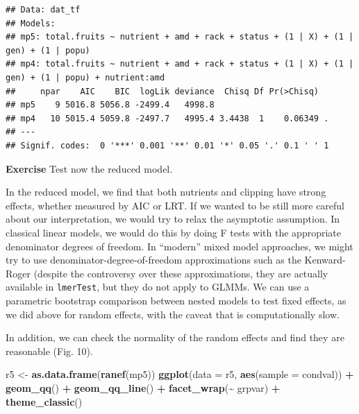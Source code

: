 \documentclass[
  12pt,
]{book}
\newenvironment{Shaded}{\begin{snugshade}}{\end{snugshade}}
\newcommand{\DataTypeTok}[1]{\textcolor[rgb]{0.13,0.29,0.53}{#1}}
\newcommand{\KeywordTok}[1]{\textcolor[rgb]{0.13,0.29,0.53}{\textbf{#1}}}
\newcommand{\NormalTok}[1]{#1}
\newcommand{\OperatorTok}[1]{\textcolor[rgb]{0.81,0.36,0.00}{\textbf{#1}}}
\newcommand{\StringTok}[1]{\textcolor[rgb]{0.31,0.60,0.02}{#1}}
\begin{document}
\begin{verbatim}
## Data: dat_tf
## Models:
## mp5: total.fruits ~ nutrient + amd + rack + status + (1 | X) + (1 | gen) + (1 | popu)
## mp4: total.fruits ~ nutrient + amd + rack + status + (1 | X) + (1 | gen) + (1 | popu) + nutrient:amd
##     npar    AIC    BIC  logLik deviance  Chisq Df Pr(>Chisq)  
## mp5    9 5016.8 5056.8 -2499.4   4998.8                       
## mp4   10 5015.4 5059.8 -2497.7   4995.4 3.4438  1    0.06349 .
## ---
## Signif. codes:  0 '***' 0.001 '**' 0.01 '*' 0.05 '.' 0.1 ' ' 1
\end{verbatim}

\textbf{Exercise}
Test now the reduced model.

In the reduced model, we find that both nutrients and clipping have strong effects, whether measured by AIC or LRT. If we wanted to be still more careful about our interpretation, we would try to relax the asymptotic assumption. In classical linear models, we would do this by doing F tests with the appropriate denominator degrees of freedom. In ``modern'' mixed model approaches, we might try to use denominator-degree-of-freedom approximations such as the Kenward-Roger (despite the controversy over these approximations, they are actually available in \texttt{lmerTest}, but they do not apply to GLMMs. We can use a parametric bootstrap comparison between nested models to test fixed effects, as we did above for random effects, with the caveat that is computationally slow.

In addition, we can check the normality of the random effects and find they are reasonable (Fig. 10).

\begin{Shaded}
\begin{Highlighting}[]
\NormalTok{r5 \textless{}{-}}\StringTok{ }\KeywordTok{as.data.frame}\NormalTok{(}\KeywordTok{ranef}\NormalTok{(mp5))}
\KeywordTok{ggplot}\NormalTok{(}\DataTypeTok{data =}\NormalTok{ r5, }\KeywordTok{aes}\NormalTok{(}\DataTypeTok{sample =}\NormalTok{ condval)) }\OperatorTok{+}
\StringTok{  }\KeywordTok{geom\_qq}\NormalTok{() }\OperatorTok{+}\StringTok{ }\KeywordTok{geom\_qq\_line}\NormalTok{() }\OperatorTok{+}
\StringTok{  }\KeywordTok{facet\_wrap}\NormalTok{(}\OperatorTok{\textasciitilde{}}\StringTok{ }\NormalTok{grpvar) }\OperatorTok{+}
\StringTok{  }\KeywordTok{theme\_classic}\NormalTok{()}
\end{Highlighting}
\end{Shaded}
\end{document}
